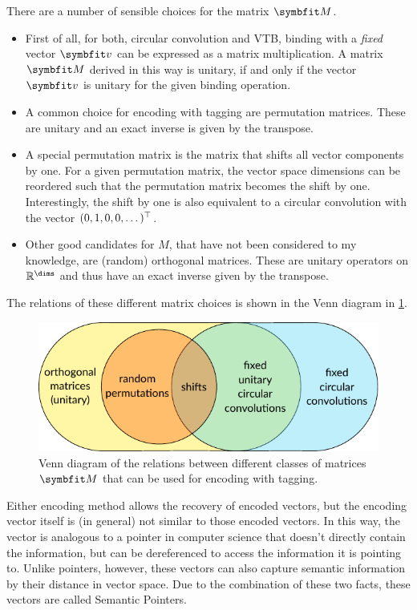 There are a number of sensible choices for the matrix $\mat M$.
\begin{itemize}
    \item First of all, for both, circular convolution and VTB, binding with a \emph{fixed} vector $\vc v$ can be expressed as a matrix multiplication.
        A matrix $\mat M$ derived in this way is unitary, if and only if the vector $\vc v$ is unitary for the given binding operation.
    \item A common choice for encoding with tagging are permutation matrices.
        These are unitary and an exact inverse is given by the transpose.
    \item A special permutation matrix is the matrix that shifts all vector components by one.
        For a given permutation matrix, the vector space dimensions can be reordered such that the permutation matrix becomes the shift by one.
        Interestingly, the shift by one is also equivalent to a circular convolution with the vector $(0, 1, 0, 0, \dotsc)^{\top}$.
    \item Other good candidates for $M$, that have not been considered to my knowledge, are (random) orthogonal matrices.
        These are unitary operators on $\mathbb{R}^{\dims}$ and thus have an exact inverse given by the transpose.
\end{itemize}
The relations of these different matrix choices is shown in the Venn diagram in \cref{fig:tagging-matrices}.
\begin{figure}
    \centering
    \includegraphics{figures/tagging-matrices}
    \caption[Venn diagram of matrices for encoding with tagging.]{Venn diagram of the relations between different classes of matrices $\mat M$ that can be used for encoding with tagging.}\label{fig:tagging-matrices}
\end{figure}

Either encoding method allows the recovery of encoded vectors, but the encoding vector itself is (in general) not similar to those encoded vectors.
In this way, the vector is analogous to a pointer in computer science that doesn't directly contain the information, but can be dereferenced to access the information it is pointing to.
Unlike pointers, however, these vectors can also capture semantic information by their distance in vector space.
Due to the combination of these two facts, these vectors are called Semantic Pointers. 


